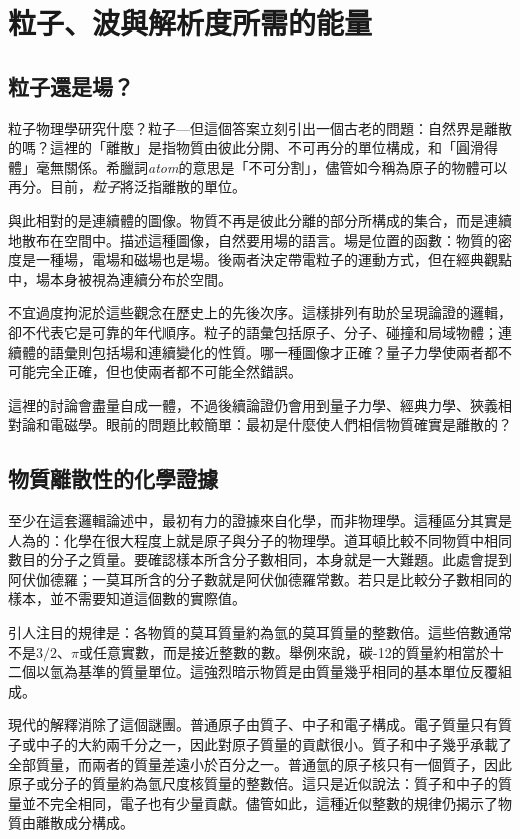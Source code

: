 \chapter{粒子、波與解析度所需的能量}

\section{粒子還是場？}

粒子物理學研究什麼？粒子---但這個答案立刻引出一個古老的問題：自然界是離散的嗎？這裡的「離散」是指物質由彼此分開、不可再分的單位構成，和「圓滑得體」毫無關係。希臘詞\emph{atom}的意思是「不可分割」，儘管如今稱為原子的物體可以再分。目前，\emph{粒子}將泛指離散的單位。

與此相對的是連續體的圖像。物質不再是彼此分離的部分所構成的集合，而是連續地散布在空間中。描述這種圖像，自然要用場的語言。場是位置的函數：物質的密度是一種場，電場和磁場也是場。後兩者決定帶電粒子的運動方式，但在經典觀點中，場本身被視為連續分布於空間。

不宜過度拘泥於這些觀念在歷史上的先後次序。這樣排列有助於呈現論證的邏輯，卻不代表它是可靠的年代順序。粒子的語彙包括原子、分子、碰撞和局域物體；連續體的語彙則包括場和連續變化的性質。哪一種圖像才正確？量子力學使兩者都不可能完全正確，但也使兩者都不可能全然錯誤。

這裡的討論會盡量自成一體，不過後續論證仍會用到量子力學、經典力學、狹義相對論和電磁學。眼前的問題比較簡單：最初是什麼使人們相信物質確實是離散的？

\section{物質離散性的化學證據}

至少在這套邏輯論述中，最初有力的證據來自化學，而非物理學。這種區分其實是人為的：化學在很大程度上就是原子與分子的物理學。道耳頓比較不同物質中相同數目的分子之質量。要確認樣本所含分子數相同，本身就是一大難題。此處會提到阿伏伽德羅；一莫耳所含的分子數就是阿伏伽德羅常數。若只是比較分子數相同的樣本，並不需要知道這個數的實際值。

引人注目的規律是：各物質的莫耳質量約為氫的莫耳質量的整數倍。這些倍數通常不是\(3/2\)、\(\pi\)或任意實數，而是接近整數的數。舉例來說，碳-12的質量約相當於十二個以氫為基準的質量單位。這強烈暗示物質是由質量幾乎相同的基本單位反覆組成。

現代的解釋消除了這個謎團。普通原子由質子、中子和電子構成。電子質量只有質子或中子的大約兩千分之一，因此對原子質量的貢獻很小。質子和中子幾乎承載了全部質量，而兩者的質量差遠小於百分之一。普通氫的原子核只有一個質子，因此原子或分子的質量約為氫尺度核質量的整數倍。這只是近似說法：質子和中子的質量並不完全相同，電子也有少量貢獻。儘管如此，這種近似整數的規律仍揭示了物質由離散成分構成。

